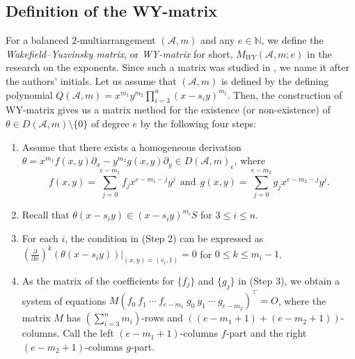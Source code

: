 \documentclass[12pt]{amsart}
\theoremstyle{definition}
\newcommand{\NN}{\mathbb{N}}
\newcommand{\AAA}{\mathcal{A}}
\begin{document}
\subsection{Definition of the WY-matrix}\label{subsection:1}
For a balanced $2$-multiarrangement $(\AAA,m)$ and any $e\in\NN$, 
we define the \emph{Wakefield--Yuzvinsky matrix}, or \emph{WY-matrix} for short, 
$M_{WY}(\AAA,m;e)$ in the research on the exponents. 
Since such a matrix was studied in \cite{Wakefield-Yuzvinsky}, 
we name it after the authors' initials. 
%
Let us assume that $(\AAA,m)$ is defined by the defining polynomial 
$Q(\AAA,m)=x^{m_1}y^{m_2}\prod_{i=3}^{n}(x-s_iy)^{m_i}$. 
Then, %
the construction of WY-matrix gives us a matrix method for 
the existence (or non-existence) of 
$\theta\in D(\AAA,m)\setminus\{0\}$ of degree $e$ by the following four steps: 
%
%
\begin{enumerate}\setlength{\leftskip}{6mm}
    \setlength{\parskip}{2mm} %
    \setlength{\itemsep}{0mm} %
        \item[\textbf{(Step 1)}] 
        Assume that there exists a homogeneous derivation 
        $\theta=x^{m_1}f(x,y)\partial_x-y^{m_2}g(x,y)\partial_y\in D(\AAA,m)_e$, where 
        $$%
        f(x,y)=\sum_{j=0}^{e-m_1}f_jx^{e-m_1-j}y^{j} \ \ 
        \text{and} \ \
        g(x,y)=\sum_{j=0}^{e-m_2}g_jx^{e-m_2-j}y^{j}.$$
        \item[\textbf{(Step 2)}] 
        Recall that $\theta(x-s_iy)\in(x-s_iy)^{m_i}S$ for $3 \leq i \leq n$. 
        \item[\textbf{(Step 3)}] 
        For each $i$, 
        the condition in (Step 2) can be expressed as 
        $(\frac{\partial}{\partial x})^k(\theta(x-s_iy))|_{(x,y)=(s_i,1)}=0$ 
        for $0\leq k \leq m_i-1$. 
        \item[\textbf{(Step 4)}] 
        As the matrix of the coefficients for $\{f_j\}$ and $\{g_j\}$ 
        in (Step 3), 
        we obtain a system of equations 
        $M (f_0 \ f_1 \ \cdots \ f_{e-m_1} \ 
        g_0 \ g_1 \ \cdots \ g_{e-m_2})^{\top}=O$, where 
        the matrix $M$ has %
        $(\sum_{i=3}^{n}m_i)$-rows and 
        $((e-m_1+1)+(e-m_2+1))$-columns. 
        Call the left $(e-m_1+1)$-columns $f$-part and 
        the right $(e-m_2+1)$-columns $g$-part. 
\end{enumerate}
\end{document}
